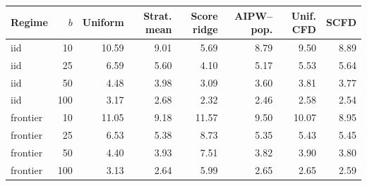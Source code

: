 \begin{tabular}{lrrrrrrr}
\toprule
Regime & $b$ & Uniform & Strat. mean & Score ridge & AIPW--pop. & Unif. CFD & SCFD \\
\midrule
iid & 10 & 10.59 & 9.01 & 5.69 & 8.79 & 9.50 & 8.89 \\
iid & 25 & 6.59 & 5.60 & 4.10 & 5.17 & 5.53 & 5.64 \\
iid & 50 & 4.48 & 3.98 & 3.09 & 3.60 & 3.81 & 3.77 \\
iid & 100 & 3.17 & 2.68 & 2.32 & 2.46 & 2.58 & 2.54 \\
frontier & 10 & 11.05 & 9.18 & 11.57 & 9.50 & 10.07 & 8.95 \\
frontier & 25 & 6.53 & 5.38 & 8.73 & 5.35 & 5.43 & 5.45 \\
frontier & 50 & 4.40 & 3.93 & 7.51 & 3.82 & 3.90 & 3.80 \\
frontier & 100 & 3.13 & 2.64 & 5.99 & 2.65 & 2.65 & 2.59 \\
\bottomrule
\end{tabular}
